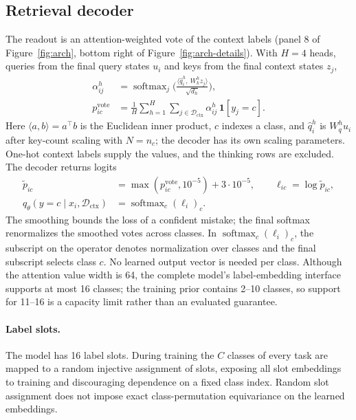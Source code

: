 \documentclass[11pt]{article}
\newcommand{\Dc}{\mathcal{D}_{\mathrm{ctx}}}
\begin{document}
\subsection{Retrieval decoder}
The readout is an attention-weighted vote of the context labels (panel 8 of Figure~\ref{fig:arch},
bottom right of Figure~\ref{fig:arch-details}). With $H=4$ heads,
queries from the final query states $u_i$ and keys from the final context states $z_j$,
\begin{equation}
\begin{aligned}
\alpha^{h}_{ij}&=\operatorname{softmax}_j\Big(\frac{\langle \widehat q_i^h,\ W_k^h z_j\rangle}{\sqrt{d_h}}\Big),\\
p^{\mathrm{vote}}_{ic}&=\frac{1}{H}\sum_{h=1}^{H}\sum_{j\in\Dc}
\alpha^{h}_{ij}\,\mathbf{1}[y_j=c].
\end{aligned}
\end{equation}
Here $\langle a,b\rangle=a^\top b$ is the Euclidean inner product, $c$ indexes a class, and
$\widehat q_i^h$ is $W_q^h u_i$ after key-count scaling with $N=n_c$; the decoder has its
own scaling parameters. One-hot context labels supply the values, and the thinking rows are
excluded. The decoder returns logits
\begin{equation}
\begin{aligned}
\widetilde p_{ic}&=\max(p^{\mathrm{vote}}_{ic},10^{-5})+3\cdot10^{-5},
\qquad \ell_{ic}=\log\widetilde p_{ic},\\
q_\theta(y=c\mid x_i,\Dc)&=\operatorname{softmax}_c(\ell_i)_c.
\end{aligned}
\end{equation}
The smoothing bounds the loss of a confident mistake; the final softmax renormalizes the smoothed
votes across classes. In $\operatorname{softmax}_c(\ell_i)_c$, the subscript on the operator denotes
normalization over classes and the final subscript selects class $c$. No learned output vector is
needed per class. Although the attention value width is 64,
the complete model's label-embedding interface supports at most 16 classes; the training prior
contains 2--10 classes, so support for 11--16 is a capacity limit rather than an evaluated guarantee.

\paragraph{Label slots.} The model has 16 label slots. During training the $C$ classes of every task
are mapped to a random injective assignment of slots, exposing all slot embeddings to training
and discouraging dependence on a fixed class index. Random slot assignment does not impose exact
class-permutation equivariance on the learned embeddings.
\end{document}
